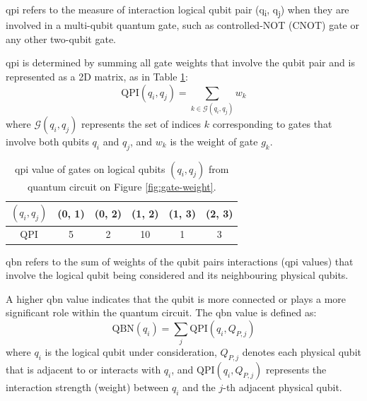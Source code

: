 \begin{definition}
    \acrfull{qpi} refers to the measure of interaction logical qubit pair (q\textsubscript{i}, q\textsubscript{j}) when they are involved in a multi-qubit quantum gate, such as controlled-NOT (CNOT) gate or any other two-qubit gate.
\end{definition}
\acrshort{qpi} is determined by summing all gate weights that involve the qubit pair and is represented as a 2D matrix, as in Table \ref{tab:qpi-matrix}:
\begin{equation}
    \text{QPI}(q_i, q_j) = \sum_{k \in \mathcal{G}(q_i, q_j)} w_k
\end{equation}
where $\mathcal{G}(q_i, q_j)$ represents the set of indices $k$ corresponding to gates that involve both qubits $q_i$ and $q_j$, and $w_k$ is the weight of gate $g_k$. \\
\begin{table}[h]
    \centering
    \begin{tabular}{|c|c|c|c|c|c|}
        \hline
        $(q_i, q_j)$ & (0, 1) & (0, 2) & (1, 2) & (1, 3) & (2, 3) \\
        \hline
        QPI & 5 & 2 & 10 & 1 & 3 \\
        \hline
    \end{tabular}
    \caption{\acrshort{qpi} value of gates on logical qubits $(q_i, q_j)$ from quantum circuit on Figure \ref{fig:gate-weight}.}
    \label{tab:qpi-matrix}
\end{table}

\begin{definition}
    \acrfull{qbn} refers to the sum of weights of the qubit pairs interactions (\acrshort{qpi} values) that involve the logical qubit being considered and its neighbouring physical qubits.
\end{definition}
A higher \acrshort{qbn} value indicates that the qubit is more connected or plays a more significant role within the quantum circuit. The \acrshort{qbn} value is defined as:
\begin{equation}
    \text{QBN}(q_i) = \sum_{j} \text{QPI}(q_i, Q_{P,j})
\end{equation}
where $q_i$ is the logical qubit under consideration, $Q_{P,j}$ denotes each physical qubit that is adjacent to or interacts with $q_i$, and $\text{QPI}(q_i, Q_{P,j})$ represents the interaction strength (weight) between $q_i$ and the $j$-th adjacent physical qubit.

